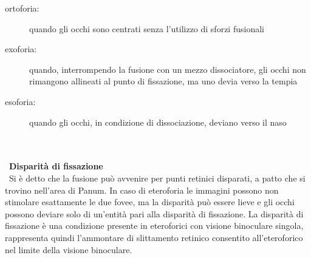  \begin{description}
 \item[ortoforia:]quando gli occhi sono centrati senza l’utilizzo di sforzi fusionali
 \item[exoforia:]quando, interrompendo la fusione con un mezzo dissociatore, gli occhi non rimangono allineati al punto di fissazione, ma uno devia verso la tempia
 \item[esoforia:]quando gli occhi, in condizione di dissociazione, deviano verso il naso
\end{description}
\\\ \\\
\textbf{Disparità di fissazione}
\\\
Si è detto che la fusione può avvenire per punti retinici disparati, a patto che si trovino nell’area di Panum. In caso di eteroforia le immagini possono non stimolare esattamente le due fovee, ma la disparità può essere lieve e gli occhi possono deviare solo di un’entità pari alla disparità di fissazione. La disparità di fissazione è una condizione presente in eteroforici con visione binoculare singola, rappresenta quindi l’ammontare di slittamento retinico consentito all’eteroforico nel limite della visione binoculare\cite{bib18}.